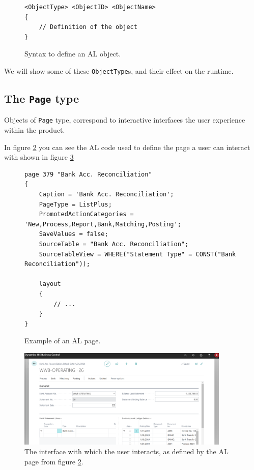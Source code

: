 \begin{figure}
    \begin{Verbatim}[fontsize=\tiny]
<ObjectType> <ObjectID> <ObjectName>
{
    // Definition of the object
}
    \end{Verbatim}
    \caption{Syntax to define an AL object.}
    \label{f:appendix-alobject}
\end{figure}

We will show some of these \texttt{ObjectType}s, and their effect on the runtime.

\subsection{The \texttt{Page} type}

Objects of \texttt{Page} type, correspond to interactive interfaces the user experience within the product.

In figure \ref{f:app-al-page-alcode} you can see the AL code used to define the page a user can interact with 
shown in figure \ref{f:app-al-page}

\begin{figure}
    \begin{Verbatim}[fontsize=\tiny]
page 379 "Bank Acc. Reconciliation"
{
    Caption = 'Bank Acc. Reconciliation';
    PageType = ListPlus;
    PromotedActionCategories = 'New,Process,Report,Bank,Matching,Posting';
    SaveValues = false;
    SourceTable = "Bank Acc. Reconciliation";
    SourceTableView = WHERE("Statement Type" = CONST("Bank Reconciliation"));

    layout
    {
        // ...
    }
}
    \end{Verbatim}
    \caption{Example of an AL page.}
    \label{f:app-al-page-alcode}
\end{figure}

\begin{figure}
    \centering
    \includegraphics[width=0.9\textwidth]{thesis/figures/images/example-al-page.png}
    \caption{The interface with which the user interacts, as defined by the AL page from figure \ref{f:app-al-page-alcode}.}
    \label{f:app-al-page}
\end{figure}

